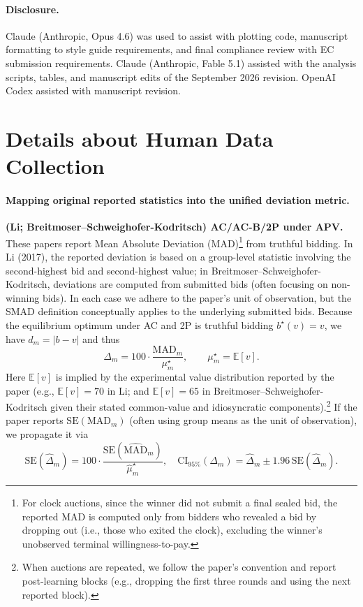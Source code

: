 \documentclass{article} %
\newif\ifmarkrev
\newcommand{\rev}[1]{\ifmarkrev\begingroup\color{red}#1\endgroup\else#1\fi}
\begin{document}
\paragraph{Disclosure.} Claude (Anthropic, Opus 4.6) was used to assist with plotting code, manuscript formatting to style guide requirements, and final compliance review with EC submission requirements. \rev{Claude (Anthropic, Fable 5.1) assisted with the analysis scripts, tables, and manuscript edits of the September 2026 revision. OpenAI Codex assisted with manuscript revision.}





\newpage
\appendix
\section{Details about Human Data Collection}\label{app:human}


\paragraph{Mapping original reported statistics into the unified \rev{deviation} metric.}

\textbf{(Li; Breitmoser--Schweighofer-Kodritsch) AC/AC-B/2P under APV.}
These papers report Mean Absolute Deviation (MAD)\footnote{For clock auctions, since the winner did not submit a final sealed bid, the reported MAD is computed only from bidders who revealed a bid by dropping out (i.e., those who exited the clock), excluding the winner's unobserved terminal willingness-to-pay.}
 from truthful bidding. In Li (2017), the reported deviation is based on a group-level statistic involving the second-highest bid and second-highest value; in Breitmoser--Schweighofer-Kodritsch, deviations are computed from submitted bids (often focusing on non-winning bids). In each case we adhere to the paper's unit of observation, but the SMAD definition conceptually applies to the underlying submitted bids.
Because the equilibrium optimum under AC and 2P is truthful bidding $b^\star(v)=v$, we have $d_m=|b-v|$ and thus
\[
\Delta_m = 100\cdot \frac{\mathrm{MAD}_m}{\mu_m^\star},
\qquad
\mu_m^\star=\mathbb E[v].
\]
Here $\mathbb E[v]$ is implied by the experimental value distribution reported by the paper (e.g., $\mathbb E[v]=70$ in Li; and $\mathbb E[v]=65$ in Breitmoser--Schweighofer-Kodritsch given their stated common-value and idiosyncratic components).\footnote{When auctions are repeated, we follow the paper's convention and report post-learning blocks (e.g., dropping the first three rounds and using the next reported block).}
If the paper reports $\mathrm{SE}(\mathrm{MAD}_m)$ (often using group means as the unit of observation), we propagate it via
\[
\mathrm{SE}(\widehat{\Delta}_m)=100\cdot \frac{\mathrm{SE}(\widehat{\mathrm{MAD}}_m)}{\widehat{\mu}_m^\star},
\quad
\mathrm{CI}_{95\%}(\Delta_m)=\widehat{\Delta}_m \pm 1.96\,\mathrm{SE}(\widehat{\Delta}_m).
\]
\end{document}

